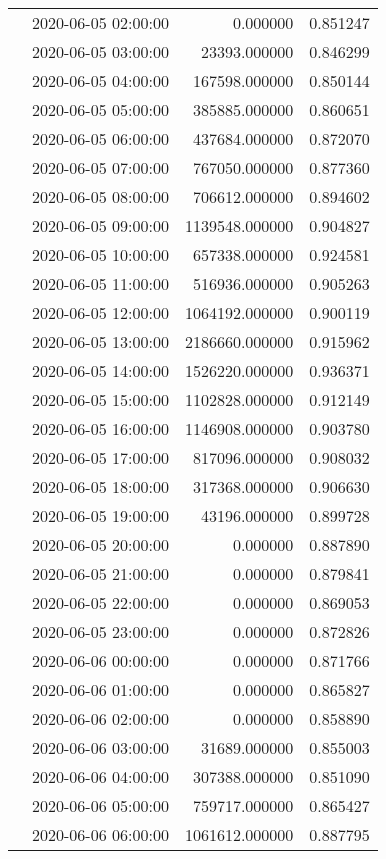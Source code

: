 \begin{tabular}{llrr}
 & 2020-06-05 02:00:00 & 0.000000 & 0.851247 \\
 & 2020-06-05 03:00:00 & 23393.000000 & 0.846299 \\
 & 2020-06-05 04:00:00 & 167598.000000 & 0.850144 \\
 & 2020-06-05 05:00:00 & 385885.000000 & 0.860651 \\
 & 2020-06-05 06:00:00 & 437684.000000 & 0.872070 \\
 & 2020-06-05 07:00:00 & 767050.000000 & 0.877360 \\
 & 2020-06-05 08:00:00 & 706612.000000 & 0.894602 \\
 & 2020-06-05 09:00:00 & 1139548.000000 & 0.904827 \\
 & 2020-06-05 10:00:00 & 657338.000000 & 0.924581 \\
 & 2020-06-05 11:00:00 & 516936.000000 & 0.905263 \\
 & 2020-06-05 12:00:00 & 1064192.000000 & 0.900119 \\
 & 2020-06-05 13:00:00 & 2186660.000000 & 0.915962 \\
 & 2020-06-05 14:00:00 & 1526220.000000 & 0.936371 \\
 & 2020-06-05 15:00:00 & 1102828.000000 & 0.912149 \\
 & 2020-06-05 16:00:00 & 1146908.000000 & 0.903780 \\
 & 2020-06-05 17:00:00 & 817096.000000 & 0.908032 \\
 & 2020-06-05 18:00:00 & 317368.000000 & 0.906630 \\
 & 2020-06-05 19:00:00 & 43196.000000 & 0.899728 \\
 & 2020-06-05 20:00:00 & 0.000000 & 0.887890 \\
 & 2020-06-05 21:00:00 & 0.000000 & 0.879841 \\
 & 2020-06-05 22:00:00 & 0.000000 & 0.869053 \\
 & 2020-06-05 23:00:00 & 0.000000 & 0.872826 \\
 & 2020-06-06 00:00:00 & 0.000000 & 0.871766 \\
 & 2020-06-06 01:00:00 & 0.000000 & 0.865827 \\
 & 2020-06-06 02:00:00 & 0.000000 & 0.858890 \\
 & 2020-06-06 03:00:00 & 31689.000000 & 0.855003 \\
 & 2020-06-06 04:00:00 & 307388.000000 & 0.851090 \\
 & 2020-06-06 05:00:00 & 759717.000000 & 0.865427 \\
 & 2020-06-06 06:00:00 & 1061612.000000 & 0.887795 \\

\end{tabular}
